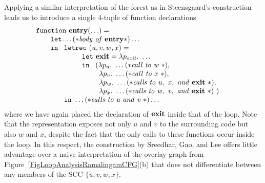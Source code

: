 \begin{description}
    Applying a similar interpretation of the forest as in
    Steensgaard's construction leads us to introduce a single 4-tuple
    of function declarations
    \begin{equation}
      \label{FunctionalSreedharGaoLee}
      \begin{array}{l}
        \mathtt{function}\ \entrynode (\ldots)=\\
        \qquad \mathtt{let} \ldots (* \mathit{body\ of\ \entrynode}*)\ldots\\ 
        \qquad \mathtt{in}\
        \begin{array}[t]{l}
          \mathtt{letrec}\ (u,v,w,x) =\\
          \qquad
          \begin{array}[t]{l}
            \mathtt{let}\ \exitnode = 
            \lambda p_{\mathit{exit}}.\ \ldots\\
            \mathtt{in}\ 
            \begin{array}[t]{l}
              (%
              \lambda p_u.\ \ldots
              (*\mathit{call\ to\ w}\ *),\\
              \ \, \lambda p_v.\ \ldots
              (*\mathit{call\ to\ x}\ *),\\
              \ \, \lambda p_w.\ \ldots
              (*\mathit{calls\ to\ u,\ x,\ and\ \exitnode}\ *),\\
              \ \, \lambda p_x.\ \ldots
              (*\mathit{calls\ to\ w,\ v,\ and\ \exitnode}\ *)\ )
            \end{array}\\
          \end{array}\\
          \mathtt{in}\ \ldots (*\mathit{calls\ to\ u\ and\ v}\ *) \ldots
        \end{array}
      \end{array}
    \end{equation} 
    where we have again placed the declaration of $\mathbf{exit}$ inside
    that of the loop. Note that the representation exposes not only
    $u$ and $v$ to the surrounding code but also $w$ and $x$, despite
    the fact that the only calls to these functions occur inside the
    loop.  In this respect, the construction by Sreedhar, Gao, and Lee
    offers little advantage over a naive interpretation of the overlay
    graph from Figure~\ref{FigLoopAnalysisRamalingamCFG}(b) that does
    not differentiate between any members of the SCC $\{u,v,w,x\}$.


\end{description}
